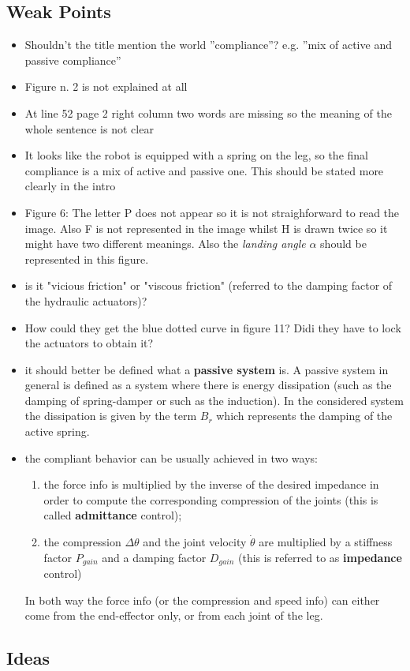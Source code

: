 \subsection*{Weak Points}
\begin{itemize}
\item Shouldn't the title mention the world ''compliance''? e.g. ''mix of active and passive compliance''
\item Figure n. 2 is not explained at all
\item At line 52 page 2 right column two words are missing so the meaning of the whole sentence is not clear
\item It looks like the robot is equipped with a spring on the leg, so the final compliance is a mix of active and passive one. This should be stated more clearly in the intro
\item Figure 6: The letter P does not appear so it is not straighforward to read the image. Also F is not represented in the image whilst H is drawn twice so it might have two different meanings. Also the \textit{landing angle} $\alpha$ should be represented in this figure.
\item is it "vicious friction" or "viscous friction" (referred to the damping factor of the hydraulic actuators)?
\item How could they get the blue dotted curve in figure 11? Didi they have to lock the actuators to obtain it?
\item it should better be defined what a \textbf{passive system} is. A passive system in general is defined as a system where there is energy dissipation (such as the damping of spring-damper or such as the induction). In the considered system the dissipation is given by the term $B_r$ which represents the damping of the active spring.
\item the compliant behavior can be usually achieved in two ways: 
\begin{enumerate}
\item the force info is multiplied by the inverse of the desired impedance in order to compute the corresponding compression of the joints (this is called \textbf{admittance} control);
\item the compression $\Delta \theta$ and the joint velocity $\dot{\theta}$ are multiplied by a stiffness factor $P_{gain}$ and a damping factor $D_{gain}$ (this is referred to as \textbf{impedance} control)
\end{enumerate}
In both way the force info (or the compression and speed info) can either come from the end-effector only, or from each joint of the leg.
\end{itemize}
\subsection*{Ideas}
